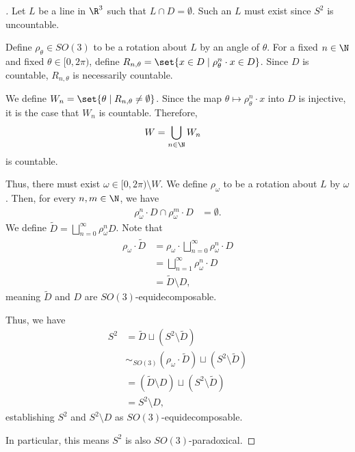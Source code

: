 \begin{proof}[]
  Let $L$ be a line in $\R^3$ such that $L\cap D = \emptyset$. Such an $L$ must exist since $S^{2}$ is uncountable.\newline

  Define $\rho_{\theta}\in SO(3)$ to be a rotation about $L$ by an angle of $\theta$. For a fixed $n\in \N$ and fixed $\theta\in [0,2\pi)$, define $R_{n,\theta} = \set{x\in D\mid \rho^{n}_{\theta}\cdot x \in D}$. Since $D$ is countable, $R_{n,\theta}$ is necessarily countable.\newline

  We define $W_n = \set{\theta\mid R_{n,\theta}\neq \emptyset}$. Since the map $\theta \mapsto \rho_{\theta}^{n}\cdot x$ into $D$ is injective, it is the case that $W_n$ is countable. Therefore,
  \begin{align*}
    W &= \bigcup_{n\in \N}W_n
  \end{align*}
  is countable.\newline

  Thus, there must exist $\omega \in [0,2\pi)\setminus W$. We define $\rho_{\omega}$ to be a rotation about $L$ by $\omega$. Then, for every $n,m\in \N$, we have
  \begin{align*}
    \rho_{\omega}^n\cdot D \cap \rho_{\omega}^{m}\cdot D &= \emptyset.
  \end{align*}
  We define $\widetilde{D} = \bigsqcup_{n=0}^{\infty}\rho^{n}_{\omega}D$. Note that 
  \begin{align*}
    \rho_{\omega}\cdot \widetilde{D} &= \rho_{\omega}\cdot\bigsqcup_{n=0}^{\infty}\rho_{\omega}^{n}\cdot D\\
                                     &= \bigsqcup_{n=1}^{\infty}\rho_{\omega}^{n}\cdot D\\
                                     &= \widetilde{D} \setminus D,
  \end{align*}
  meaning $\widetilde{D}$ and $D$ are $SO(3)$-equidecomposable.\newline

  Thus, we have
  \begin{align*}
    S^{2} &= \widetilde{D}\sqcup \left(S^{2}\setminus \widetilde{D}\right)\\
          &\sim_{SO(3)}\left(\rho_{\omega}\cdot \widetilde{D}\right)\sqcup \left(S^{2}\setminus\widetilde{D}\right)\\
          &= \left(\widetilde{D}\setminus D\right)\sqcup \left(S^{2}\setminus\widetilde{D}\right)\\
          &= S^{2}\setminus D,
  \end{align*}
  establishing $S^{2}$ and $S^{2}\setminus D$ as $SO(3)$-equidecomposable.\newline

  In particular, this means $S^{2}$ is also $SO(3)$-paradoxical.
\end{proof}
